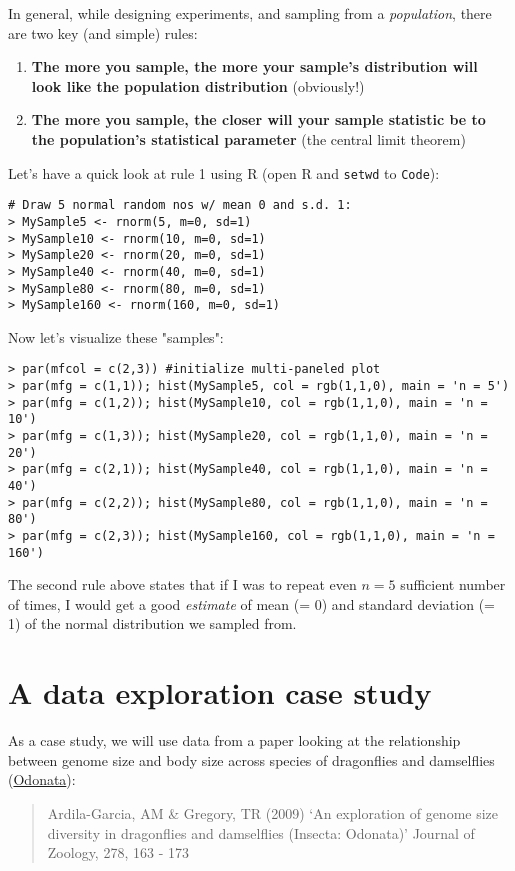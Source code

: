 In general, while designing experiments, and sampling from a {\it 
population}, there are two key (and simple) rules:
\begin{enumerate}
    \item {\bf The more you sample, the more your sample's distribution 
    will look like the population distribution} (obviously!)
    \item {\bf The more you sample, the closer will your sample 
    statistic be to the population's statistical parameter} (the 
    central limit theorem)
\end{enumerate}

Let's have a quick look at rule 1 using R (open R and {\tt setwd} to 
{\tt Code}):
\begin{lstlisting}
# Draw 5 normal random nos w/ mean 0 and s.d. 1:
> MySample5 <- rnorm(5, m=0, sd=1) 
> MySample10 <- rnorm(10, m=0, sd=1) 
> MySample20 <- rnorm(20, m=0, sd=1) 
> MySample40 <- rnorm(40, m=0, sd=1)
> MySample80 <- rnorm(80, m=0, sd=1)
> MySample160 <- rnorm(160, m=0, sd=1)
\end{lstlisting}
Now let's visualize these "samples":
\begin{lstlisting}
> par(mfcol = c(2,3)) #initialize multi-paneled plot
> par(mfg = c(1,1)); hist(MySample5, col = rgb(1,1,0), main = 'n = 5') 
> par(mfg = c(1,2)); hist(MySample10, col = rgb(1,1,0), main = 'n = 10') 
> par(mfg = c(1,3)); hist(MySample20, col = rgb(1,1,0), main = 'n = 20') 
> par(mfg = c(2,1)); hist(MySample40, col = rgb(1,1,0), main = 'n = 40') 
> par(mfg = c(2,2)); hist(MySample80, col = rgb(1,1,0), main = 'n = 80') 
> par(mfg = c(2,3)); hist(MySample160, col = rgb(1,1,0), main = 'n = 160') 
\end{lstlisting}
The second rule above states that if I was to repeat even $n 
= 5$ sufficient number of times, I would get a good {\it estimate} of 
mean (= 0) and standard deviation (= 1) of the normal distribution we 
sampled from. 


\section{A data exploration case study}

As a case study, we will use data from a paper looking at the 
relationship between genome size and body size across species of 
dragonflies and damselflies 
(\href{http://en.wikipedia.org/wiki/Odonata}{Odonata}):

\begin{quote}
Ardila-Garcia, AM \& Gregory, TR (2009) `An exploration of genome size 
diversity in dragonflies and damselflies (Insecta: Odonata)' Journal of 
Zoology, 278, 163 - 173
\end{quote}

